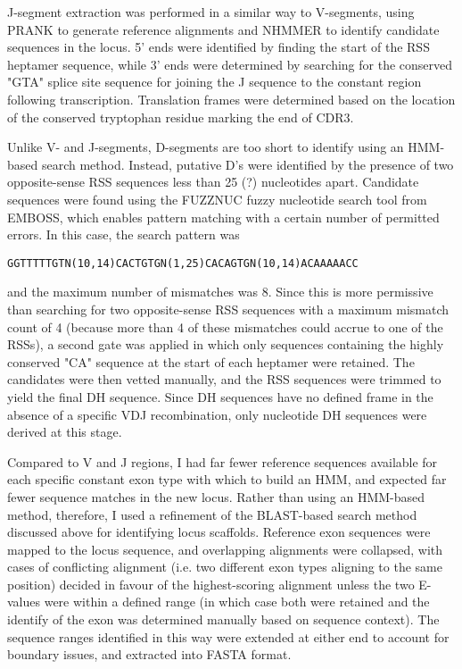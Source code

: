 
J-segment extraction was performed in a similar way to V-segments, using PRANK to generate reference alignments and NHMMER to identify candidate sequences in the locus. 5' ends were identified by finding the start of the RSS heptamer sequence, while 3' ends were determined by searching for the conserved "GTA" splice site sequence for joining the J sequence to the constant region following transcription. Translation frames were determined based on the location of the conserved tryptophan residue marking the end of CDR3.

Unlike V- and J-segments, D-segments are too short to identify using an HMM-based search method. Instead, putative D's were identified by the presence of two opposite-sense RSS sequences less than 25 (?) nucleotides apart. Candidate sequences were found using the FUZZNUC fuzzy nucleotide search tool from EMBOSS, which enables pattern matching with a certain number of permitted errors. In this case, the search pattern was

\texttt{GGTTTTTGTN(10,14)CACTGTGN(1,25)CACAGTGN(10,14)ACAAAAACC}

and the maximum number of mismatches was 8. Since this is more permissive than searching for two opposite-sense RSS sequences with a maximum mismatch count of 4 (because more than 4 of these mismatches could accrue to one of the RSSs), a second gate was applied in which only sequences containing the highly conserved "CA" sequence at the start of each heptamer were retained. The candidates were then vetted manually, and the RSS sequences were trimmed to yield the final DH sequence. Since DH sequences have no defined frame in the absence of a specific VDJ recombination, only nucleotide DH sequences were derived at this stage.


Compared to V and J regions, I had far fewer reference sequences available for each specific constant exon type with which to build an HMM, and expected far fewer sequence matches in the new locus. Rather than using an HMM-based method, therefore, I used a refinement of the BLAST-based search method discussed above for identifying locus scaffolds. Reference exon sequences were mapped to the locus sequence, and overlapping alignments were collapsed, with cases of conflicting alignment (i.e. two different exon types aligning to the same position) decided in favour of the highest-scoring alignment unless the two E-values were within a defined range (in which case both were retained and the identify of the exon was determined manually based on sequence context). The sequence ranges identified in this way were extended at either end to account for boundary issues, and extracted into FASTA format.

